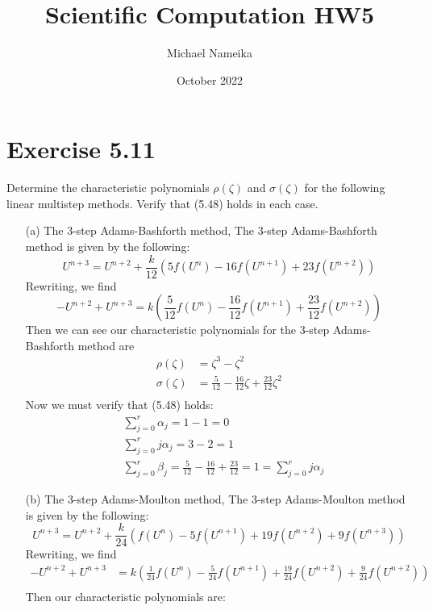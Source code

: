 \documentclass{article}
\title{Scientific Computation HW5}
\author{Michael Nameika}
\date{October 2022}
\begin{document}
\maketitle

\section*{Exercise 5.11}

Determine the characteristic polynomials $\rho(\zeta)$ and $\sigma(\zeta)$ for the following linear multistep methods. Verify that (5.48) holds in each case. 
\begin{enumerate}
    \item[(a)] The 3-step Adams-Bashforth method,
    \newline
    The 3-step Adams-Bashforth method is given by the following:
    \[U^{n+3} = U^{n+2} + \frac{k}{12}(5f(U^n) - 16f(U^{n+1}) + 23f(U^{n+2}))\]
    Rewriting, we find
    \[-U^{n+2} + U^{n+3} = k\left( \frac{5}{12}f(U^{n}) - \frac{16}{12}f(U^{n+1}) + \frac{23}{12}f(U^{n+2})\right)\]
    Then we can see our characteristic polynomials for the 3-step Adams-Bashforth method are
    \begin{align*}
        \rho(\zeta) &= \zeta^3 - \zeta^2 \\
        \sigma(\zeta) &= \frac{5}{12} - \frac{16}{12}\zeta + \frac{23}{12}\zeta^2 \\
    \end{align*}
    Now we must verify that (5.48) holds:
    \begin{align*}
        &\sum_{j=0}^r \alpha_j = 1 - 1 = 0 \\
        &\sum_{j=0}^r j\alpha_j = 3 - 2 = 1 \\
        &\sum_{j=0}^r \beta_j = \frac{5}{12} - \frac{16}{12} + \frac{23}{12} = 1 = \sum_{j=0}^r j\alpha_j
    \end{align*}
    \item[(b)] The 3-step Adams-Moulton method,
    \newline
    The 3-step Adams-Moulton method is given by the following:
    \[U^{n+3} = U^{n+2} + \frac{k}{24}(f(U^n) - 5f(U^{n+1}) + 19f(U^{n+2}) + 9f(U^{n+3}))\]
    Rewriting, we find
    \begin{align*}
        -U^{n+2} + U^{n+3} &= k\left( \frac{1}{24}f(U^n) - \frac{5}{24}f(U^{n+1}) + \frac{19}{24}f(U^{n+2}) + \frac{9}{24}f(U^{n+2}) \right) \\
    \end{align*}
    Then our characteristic polynomials are:

\end{enumerate}
\end{document}
